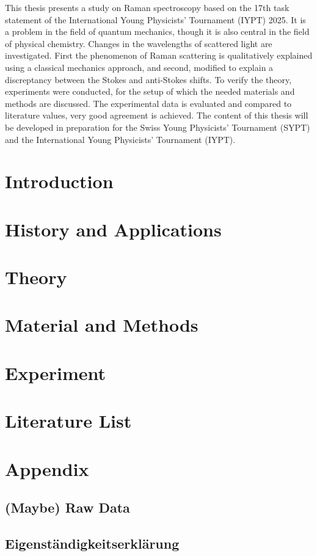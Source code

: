 \documentclass[a4paper]{article}
\begin{document}
This thesis presents a study on Raman spectroscopy based on the 17th task statement of the International Young Physicists' Tournament (IYPT) 2025. It is a problem in the field of quantum mechanics, though it is also central in the field of physical chemistry. Changes in the wavelengths of scattered light are investigated. First the phenomenon of Raman scattering is qualitatively explained using a classical mechanics approach, and second, modified to explain a discreptancy between the Stokes and anti-Stokes shifts. To verify the theory, experiments were conducted, for the setup of which the needed materials and methods are discussed. The experimental data is evaluated and compared to literature values, very good agreement is achieved. The content of this thesis will be developed in preparation for the Swiss Young Physicists' Tournament (SYPT) and the International Young Physicists' Tournament (IYPT).

\newpage

\tableofcontents
\newpage

\section{Introduction}

\newpage

\section{History and Applications}

\newpage

\section{Theory}

\newpage

\section{Material and Methods}\label{mat_met}

\newpage

\section{Experiment}


\newpage


\newpage

\section*{Literature List}
\printbibliography

\section{Appendix}


\subsection*{(Maybe) Raw Data}
\subsection*{Eigenständigkeitserklärung}
\end{document}
